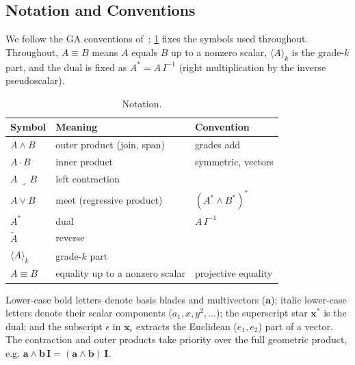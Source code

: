 \documentclass{birkjour}
\theoremstyle{definition}
\theoremstyle{remark}
\newcommand{\grade}[1]{\langle #1 \rangle}
\newcommand{\meet}{\vee}
\newcommand{\joinp}{\wedge}
\begin{document}
\subsection{Notation and Conventions}
\label{sec:notation}
We follow the GA conventions of~\cite{dorst_geometric_2010,perwass_geometric_2009};
\cref{tab:notation} fixes the symbols used throughout.
Throughout, $A \equiv B$ means $A$ equals $B$ up
to a nonzero scalar, $\grade{A}_k$ is the grade-$k$ part, and the dual is fixed
as $A^{*} = A\,I^{-1}$ (right multiplication by the inverse pseudoscalar).

\begin{table}[H]
\centering
\caption{Notation.}
\label{tab:notation}
\begin{tabular}{@{}lll@{}}
\toprule
Symbol & Meaning & Convention \\
\midrule
$A\joinp B$        & outer product (join, span)        & grades add \\
$A\cdot B$         & inner product                     & symmetric, vectors \\
$A\,\lrcorner\,B$  & left contraction                  & \cite{dorst_inner_2002} \\
$A\meet B$         & meet (regressive product)         & $(A^{*}\joinp B^{*})^{*}$ \\
$A^{*}$            & dual                              & $A\,I^{-1}$ \\
$\tilde A$         & reverse                           & \\
$\grade{A}_k$      & grade-$k$ part                    & \\
$A \equiv B$       & equality up to a nonzero scalar   & projective equality \\
\bottomrule
\end{tabular}
\end{table}
Lower-case bold letters denote basis blades and multivectors ($\mathbf{a}$);
italic lower-case letters denote their scalar components ($a_1, x, y^2, \dots$);
the superscript star $\mathbf{x}^{*}$ is the dual; and the subscript $\epsilon$
in $\mathbf{x}_\epsilon$ extracts the Euclidean ($e_1,e_2$) part of a vector.
The contraction and outer products take priority over the full geometric
product, e.g. $\mathbf{a}\wedge\mathbf{b}\,\mathbf{I} =
(\mathbf{a}\wedge\mathbf{b})\,\mathbf{I}$.

\end{document}
